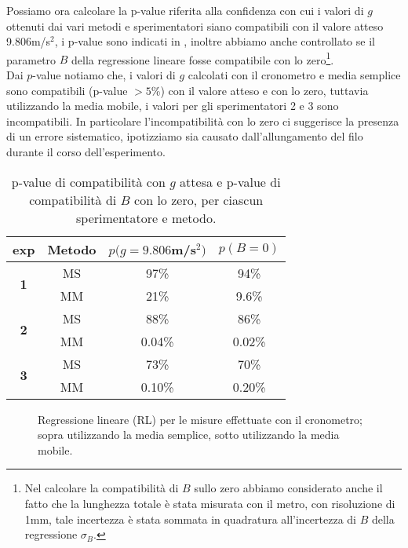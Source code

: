 Possiamo ora calcolare la p-value riferita alla confidenza con cui i valori di $g$ ottenuti dai vari metodi e sperimentatori siano compatibili con il valore atteso 9.806m/s$^2$, i p-value sono indicati in , inoltre abbiamo anche controllato se il parametro $B$ della regressione lineare fosse compatibile con lo zero\footnote{Nel calcolare la compatibilità di $B$ sullo zero abbiamo considerato anche il fatto che la lunghezza totale è stata misurata con il metro, con risoluzione di 1mm, tale incertezza è stata sommata in quadratura all'incertezza di $B$ della regressione $\sigma_B$.}.\\
Dai $p$-value notiamo che, i valori di $g$ calcolati con il cronometro e media semplice sono compatibili (p-value $> 5$\%) con il valore atteso e con lo zero, tuttavia utilizzando la media mobile, i valori per gli sperimentatori 2 e 3 sono incompatibili. In particolare l'incompatibilità con lo zero ci suggerisce la presenza di un errore sistematico, ipotizziamo sia causato dall'allungamento del filo durante il corso dell'esperimento.\\ 

\begin{table}[h]
\centering
\begin{tabular}{c|c|c|c}
    \textbf{exp} & \textbf{Metodo} & $p(g = 9.806$m/s$^2)$ & $p(B = 0)$ \\
    \hline
    \multirow{2}{*}{\textbf{1}} & MS & 97\% & 94\% \\
                            & MM & 21\% & 9.6\% \\
    \hline
    \multirow{2}{*}{\textbf{2}} & MS & 88\% & 86\% \\
                             & MM & 0.04\% & 0.02\% \\
    \hline
    \multirow{2}{*}{\textbf{3}} & MS & 73\% & 70\% \\
                             & MM & 0.10\% & 0.20\% \\
\end{tabular}
\caption{p-value di compatibilità con \( g \) attesa e p-value di compatibilità di $B$ con lo zero, per ciascun sperimentatore e metodo.}
\label{tab:p_values}
\end{table}

\begin{figure}[h]
    \centering
    
    \caption{Regressione lineare (RL) per le misure effettuate con il cronometro; sopra utilizzando la media semplice, sotto utilizzando la media mobile.}
    \label{fig:reg lin cronometro}
\end{figure}



